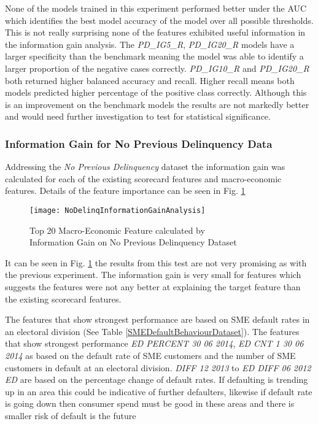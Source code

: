 None of the models trained in this experiment performed better under the AUC which identifies the best model accuracy of the model over all possible thresholds. This is not really surprising none of the features exhibited useful information in the information gain analysis. The \textit{PD\_IG5\_R}, \textit{PD\_IG20\_R} models have a larger specificity than the benchmark meaning the model was able to identify a larger proportion of the negative cases correctly. \textit{PD\_IG10\_R} and \textit{PD\_IG20\_R} both returned higher balanced accuracy and recall. Higher recall means both models predicted higher percentage of the positive class correctly. Although this is an improvement on the benchmark models the results are not markedly better and would need further investigation to test for statistical significance.

\subsubsection{Information Gain for No Previous Delinquency Data}\label{IGNPDExper}
Addressing the \textit{No Previous Delinquency} dataset the information gain was calculated for each of the existing scorecard features and macro-economic features. Details of the feature importance can be seen in Fig. \ref{fig:NoDelinqInformationGainAnalysis}

\begin{figure}[H]
	\texttt{[image: NoDelinqInformationGainAnalysis]}
	\caption{Top 20 Macro-Economic Feature calculated by \\ Information Gain on No Previous Delinquency Dataset}
	\label{fig:NoDelinqInformationGainAnalysis}
\end{figure}

It can be seen in Fig. \ref{fig:NoDelinqInformationGainAnalysis} the results from this test are not very promising as with the previous experiment. The information gain is very small for features which suggests the features were not any better at explaining the target feature than the existing scorecard features. 

The features that show strongest performance are based on SME default rates in an electoral division (See Table \ref{SMEDefaultBehaviourDataset}). The features that show strongest performance \textit{ED PERCENT 30 06 2014}, \textit{ED CNT 1 30 06 2014} as based on the default rate of SME customers and the number of SME customers in default at an electoral division. \textit{DIFF 12 2013} to \textit{ED DIFF 06 2012 ED} are based on the percentage change of default rates.  If defaulting is trending up in an area this could be indicative of further defaulters, likewise if default rate is going down then consumer spend must be good in these areas and there is smaller risk of default is the future

